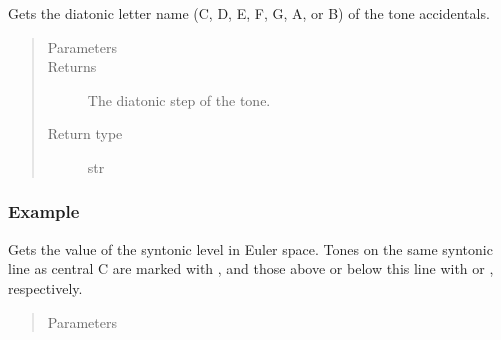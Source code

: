 \documentclass[letterpaper,10pt,english]{sphinxmanual}
\begin{document}
\begin{fulllineitems}
\begin{fulllineitems}
\end{fulllineitems}



\begin{fulllineitems}
Gets the diatonic letter name (C, D, E, F, G, A, or B) of the tone  accidentals.
\begin{quote}\begin{description}
\item[{Parameters}] \leavevmode
{} \textendash{} 

\item[{Returns}] \leavevmode
The diatonic step of the tone.

\item[{Return type}] \leavevmode
str

\end{description}\end{quote}
\subsubsection*{Example}

\begin{sphinxVerbatim}[commandchars=\\\{\}]
   
\end{sphinxVerbatim}

\end{fulllineitems}



\begin{fulllineitems}
Gets the value of the syntonic level in Euler space.
Tones on the same syntonic line as central C are marked with \sphinxtitleref{\_},
and those above or below this line with  or \sphinxtitleref{,}, respectively.
\begin{quote}\begin{description}
\item[{Parameters}] \leavevmode
{} \textendash{} 


\end{description}
\end{quote}
\end{fulllineitems}
\end{fulllineitems}
\end{document}
